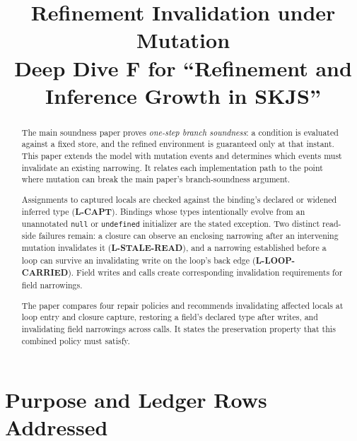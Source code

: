 \documentclass[11pt]{article}
\title{Refinement Invalidation under Mutation\\
{\large Deep Dive F for ``Refinement and Inference Growth in SKJS''}}
\author{}
\date{\skjspin}
\begin{document}
\maketitle

\begin{abstract}
The main soundness paper proves \emph{one-step branch soundness}: a
condition is evaluated against a fixed store, and the refined environment
is guaranteed only at that instant. This paper extends the model with
mutation events and determines which events must invalidate an existing
narrowing. It relates each implementation path to the point where mutation
can break the main paper's branch-soundness argument.

Assignments to captured locals are checked against the binding's declared or
widened inferred type (\textbf{L-CAPT}). Bindings whose types intentionally
evolve from an unannotated \texttt{null} or \texttt{undefined} initializer are
the stated exception. Two distinct read-side failures remain: a closure can
observe an enclosing narrowing after an intervening mutation invalidates it
(\textbf{L-STALE-READ}), and a narrowing established before a loop can survive
an invalidating write on the loop's back edge
(\textbf{L-LOOP-CARRIED}). Field writes and calls create corresponding
invalidation requirements for field narrowings.

The paper compares four repair policies and recommends invalidating affected
locals at loop entry and closure capture, restoring a field's declared type
after writes, and invalidating field narrowings across calls. It states the
preservation property that this combined policy must satisfy.
\end{abstract}

\tableofcontents

\section{Purpose and Ledger Rows Addressed}
\label{sec:purpose}
\end{document}
